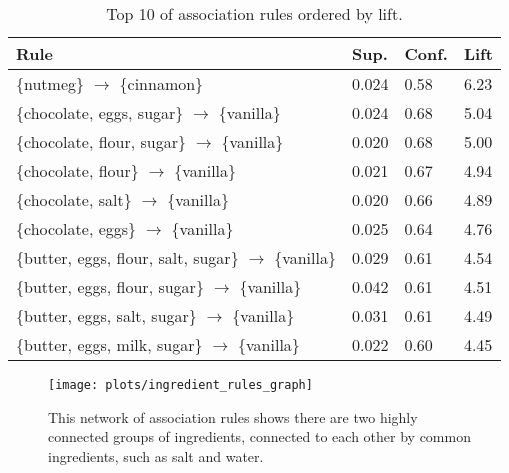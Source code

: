 \begin{table}[htbp]
	\caption{Top 10 of association rules ordered by lift.}
	\label{tab:rules_top10}
	
	\centering
	\begin{tabular}{l l l l}
		\toprule
		\textbf{Rule} & \textbf{Sup.} & \textbf{Conf.} & \textbf{Lift} \\
		\midrule
		\{nutmeg\} $\rightarrow$ \{cinnamon\} & 0.024 & 0.58 & 6.23 \\
		\{chocolate, eggs, sugar\} $\rightarrow$ \{vanilla\} & 0.024 & 0.68 & 5.04 \\
		\{chocolate, flour, sugar\} $\rightarrow$ \{vanilla\} & 0.020 & 0.68 & 5.00 \\
		\{chocolate, flour\} $\rightarrow$ \{vanilla\} & 0.021 & 0.67 & 4.94 \\
		\{chocolate, salt\} $\rightarrow$ \{vanilla\} & 0.020 & 0.66 & 4.89 \\
		\{chocolate, eggs\} $\rightarrow$ \{vanilla\} & 0.025 & 0.64 & 4.76 \\
		\{butter, eggs, flour, salt, sugar\} $\rightarrow$ \{vanilla\} & 0.029 & 0.61 & 4.54 \\
		\{butter, eggs, flour, sugar\} $\rightarrow$ \{vanilla\} & 0.042 & 0.61 & 4.51 \\
		\{butter, eggs, salt, sugar\} $\rightarrow$ \{vanilla\} & 0.031 & 0.61 & 4.49 \\
		\{butter, eggs, milk, sugar\} $\rightarrow$ \{vanilla\} & 0.022 & 0.60 & 4.45 \\
		\bottomrule
	\end{tabular}
	
\end{table}

\begin{figure}[htbp]
		
\end{figure}


\begin{figure}[htbp]
	\centering

	\texttt{[image: plots/ingredient\_rules\_graph]}
	
	\caption{This network of association rules shows there are two highly connected groups of ingredients, connected to each other by common ingredients, such as salt and water.}
	\label{fig:ingredient_rules_graph}
\end{figure}




